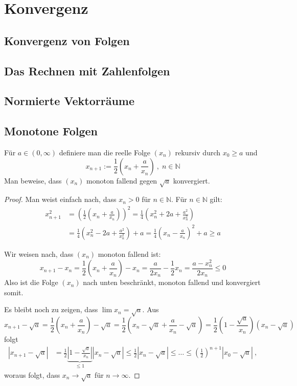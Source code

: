 \chapter{Konvergenz}
\section{Konvergenz von Folgen}
\section{Das Rechnen mit Zahlenfolgen}
\section{Normierte Vektorräume}
\section{Monotone Folgen}

\setcounter{aufgabe}{3}
\begin{aufgabe}
Für $a \in (0, \infty)$ definiere man die reelle Folge $(x_n)$ rekursiv durch $x_0 \geq a$ und
\[
x_{n+1} := \frac 1 2 \left( x_n + \frac{a}{x_n} \right) \ , \; n \in \mathbb N
\]
Man beweise, dass $(x_n)$ monoton fallend gegen $\sqrt{a}$ konvergiert.
\end{aufgabe}
\begin{proof}
Man weist einfach nach, dass $x_n > 0$ für $n \in \mathbb N$.
Für $n \in \mathbb N$ gilt:
\begin{align*}
x_{n+1}^2 &= \left( \frac 1 2 \left( x_n + \frac{a}{x_n} \right) \right)^2
	= \frac 1 4 \left( x_n^2 + 2a + \frac{a^2}{x_n^2} \right) \\
	&= \frac 1 4 \left( x_n^2 - 2a  + \frac{a^2}{x_n^2} \right) + a 
	= \frac 1 4 \left( x_n - \frac{a}{x_n} \right)^2 + a \geq a
\end{align*}

Wir weisen nach, dass $(x_n)$ monoton fallend ist:
\[
x_{n+1} - x_n = \frac 1 2 \left( x_n + \frac{a}{x_n} \right) - x_n
	= \frac{a}{2x_n} - \frac 1 2 x_n = \frac{a - x_n^2}{2 x_n} \leq 0
\]
Also ist die Folge $(x_n)$ nach unten beschränkt, monoton fallend und konvergiert somit.

Es bleibt noch zu zeigen, dass $\lim x_n = \sqrt{a}$.
Aus 
\[
x_{n+1} - \sqrt{a}
	= \frac 1 2 \left( x_n + \frac{a}{x_n} \right) - \sqrt{a}
	= \frac 1 2 \left( x_n - \sqrt{a} + \frac{a}{x_n} - \sqrt{a} \right)
	= \frac 1 2 \left( 1 - \frac{\sqrt{a}}{x_n} \right) \left( x_n - \sqrt{a} \right)
\]
folgt
\begin{align*}
| x_{n+1} - \sqrt{a} |
	&= \frac 1 2 \underbrace{ \left| 1 - \frac{\sqrt{a}}{x_n} \right| }_{\leq 1}
	\left| x_n - \sqrt{a} \right|
	\leq \frac 1 2 | x_n - \sqrt{a} |
	\leq \ldots \leq \left( \frac 1 2 \right)^{n+1} | x_0 - \sqrt{a} | \ ,
\end{align*}
woraus folgt, dass $x_n \to \sqrt{a}$ für $n \to \infty$.

\end{proof}


